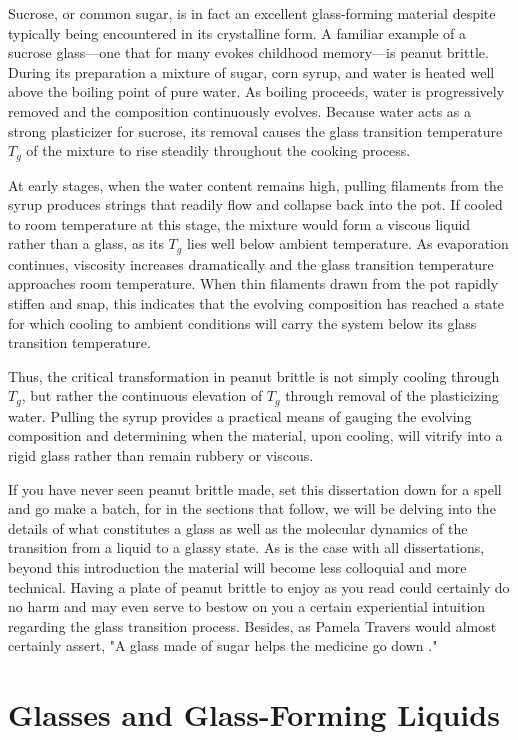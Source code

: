Sucrose, or common sugar, is in fact an excellent glass-forming material despite typically being encountered in its crystalline form. A familiar example of a sucrose glass—one that for many evokes childhood memory—is peanut brittle. During its preparation a mixture of sugar, corn syrup, and water is heated well above the boiling point of pure water. As boiling proceeds, water is progressively removed and the composition continuously evolves. Because water acts as a strong plasticizer for sucrose, its removal causes the glass transition temperature $T_g$ of the mixture to rise steadily throughout the cooking process.

At early stages, when the water content remains high, pulling filaments from the syrup produces strings that readily flow and collapse back into the pot. If cooled to room temperature at this stage, the mixture would form a viscous liquid rather than a glass, as its $T_g$ lies well below ambient temperature. As evaporation continues, viscosity increases dramatically and the glass transition temperature approaches room temperature. When thin filaments drawn from the pot rapidly stiffen and snap, this indicates that the evolving composition has reached a state for which cooling to ambient conditions will carry the system below its glass transition temperature. 

Thus, the critical transformation in peanut brittle is not simply cooling through $T_g$, but rather the continuous elevation of $T_g$ through removal of the plasticizing water. Pulling the syrup provides a practical means of gauging the evolving composition and determining when the material, upon cooling, will vitrify into a rigid glass rather than remain rubbery or viscous.

If you have never seen peanut brittle made, set this dissertation down for a spell and go make a batch, for in the sections that follow, we will be delving into the details of what constitutes a glass as well as the molecular dynamics of the transition from a liquid to a glassy state.  As is the case with all dissertations, beyond this introduction the material will become less colloquial and more technical.  Having a plate of peanut brittle to enjoy as you read could certainly do no harm and may even serve to bestow on you a certain experiential intuition regarding the glass transition process.  Besides, as Pamela Travers would almost certainly assert, "A glass made of sugar helps the medicine go down \nolinebreak \cite{Travers}."
	 

\section{Glasses and Glass-Forming Liquids}


